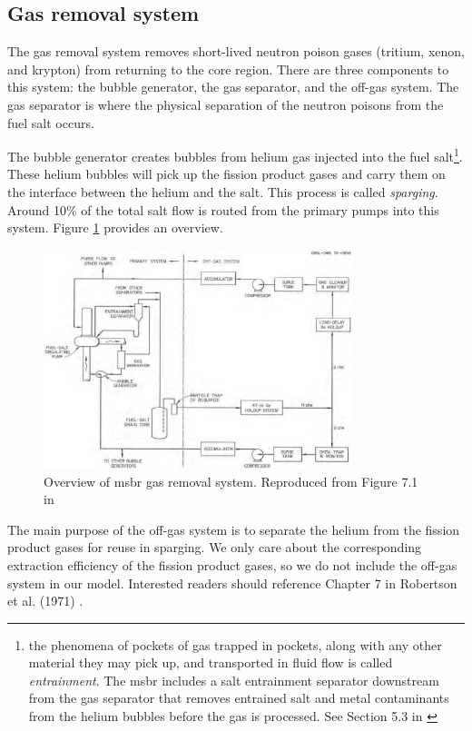 \subsection{Gas removal system}
The gas removal system removes short-lived neutron poison gases (tritium,
xenon, and krypton) from returning to the core region. There are three
components to this system: the bubble generator, the gas separator, and the
off-gas system. The gas separator is where the physical separation of the
neutron poisons from the fuel salt occurs.

The bubble generator creates bubbles from helium gas injected into the fuel
salt\footnote{the phenomena of pockets of gas trapped in pockets, along with any
other material they may pick up, and transported in fluid flow is called {\it
entrainment}. The \Gls{msbr} includes a salt entrainment separator downstream
from the gas separator that removes entrained salt and metal contaminants from
the helium bubbles before the gas is processed. See Section 5.3 in
\cite{rosenthal_molten-salt_1968}}. These helium bubbles will pick up the
fission product gases and carry them on the interface between the helium and the
salt. This process is called {\it sparging}. Around 10\% of the total salt flow
is routed from the primary pumps into this system. Figure
\ref{fig:gas_removal_system} provides an overview.

\begin{figure}[htpb]
    \centering
    \includegraphics[width=0.8\textwidth]{figs/ch4/gas_removal_system.png}
    \caption{Overview of \Gls{msbr} gas removal system. Reproduced from Figure 7.1 in \cite{robertson_conceptual_1971}}
    \label{fig:gas_removal_system}
\end{figure}

The main purpose of the off-gas system is to separate the helium from the
fission product gases for reuse in sparging. We only care about the
corresponding extraction efficiency of the fission product gases, so we do
not include the off-gas system in our model. Interested readers should reference
Chapter 7 in Robertson et al. (1971) \cite{robertson_conceptual_1971}.

